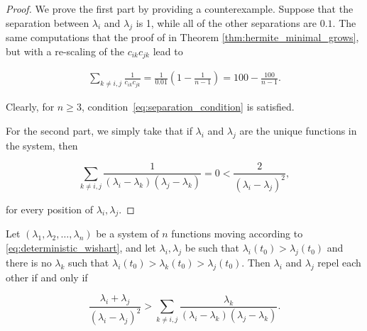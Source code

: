 \begin{proof}
    We prove the first part by providing a counterexample. Suppose that the separation between $\lambda_i$ and $\lambda_j$ is 1, while all of the other separations are $0.1$. The same computations that the proof of in Theorem \ref{thm:hermite_minimal_grows}, but with a re-scaling of the $c_{ik}c_{jk}$ lead to

    \begin{align*}
        \sum_{k\neq i,j} \frac{1}{c_{ik}c_{jk}} = \frac{1}{0.01}\left( 1 - \frac1{n-1}\right) = 100 - \frac{100}{n-1}.
    \end{align*}

    Clearly, for $n\ge 3$, condition~\eqref{eq:separation_condition} is satisfied.

    For the second part, we simply take that if $\lambda_i$ and $\lambda_j$ are the unique functions in the system, then 

    \begin{equation*}
        \sum_{k\neq i,j} \frac{1}{(\lambda_i - \lambda_k)(\lambda_j - \lambda_k)} = 0 < \frac{2}{(\lambda_i - \lambda_j)^2},
    \end{equation*}

    \noindent for every position of $\lambda_i, \lambda_j$.
\end{proof}

\begin{lemma} \label{lemma:separating_condition_wishart}
    Let $(\lambda_1, \lambda_2, \dots, \lambda_n)$ be a system of $n$ functions moving according to \eqref{eq:deterministic_wishart}, and let $\lambda_i, \lambda_j$ be such that $\lambda_i(t_0) > \lambda_j(t_0)$ and there is no $\lambda_k$ such that $\lambda_i(t_0) > \lambda_k(t_0) > \lambda_j(t_0)$. Then $\lambda_i$ and $\lambda_j$ repel each other if and only if 

    \begin{equation} \label{eq:separation_condition_wishart}
        \frac{\lambda_i + \lambda_j}{(\lambda_i - \lambda_j)^2} > \sum_{k\neq i,j} \frac{\lambda_k}{(\lambda_i-\lambda_k)(\lambda_j-\lambda_k)}.
    \end{equation}
\end{lemma}

